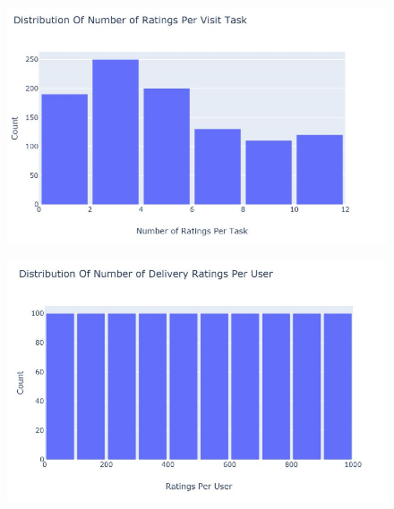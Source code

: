 \documentclass{aifyp}
\begin{document}
\begin{appendices}
\begin{figure}[H]
    \label{fig:DistNumRatingPerInterviewBarchart}
\end{figure}
\begin{figure}[H]
    \centering
    \includegraphics[scale=0.5]{Images/Chapter6/DistofNumofVisitRatingPerTask.JPG}
    \label{fig:DistNumRatingPerVisitBarchart}
\end{figure}
\begin{figure}[H]
    \centering
    \includegraphics[scale=0.5]{Images/Chapter6/DistributionofRatingsPerUserDeliv.JPG}
    \label{fig:DistDelivRatingPerUserBarchart}
\end{figure}
\begin{figure}[H]
    \centering

\end{figure}
\end{appendices}
\end{document}
